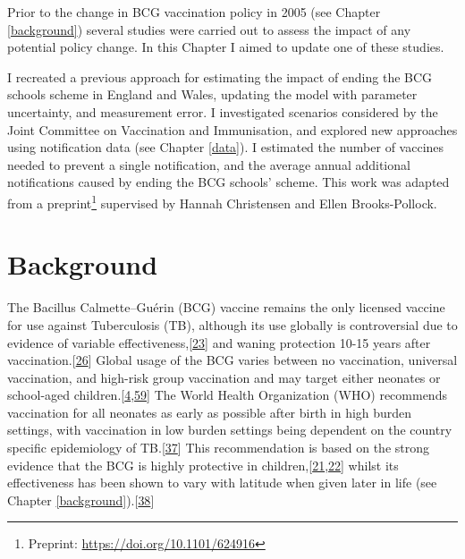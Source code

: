 \documentclass[11pt,twoside]{bristolthesis}
\begin{document}
  Prior to the change in BCG vaccination policy in 2005 (see Chapter \ref{background}) several studies were carried out to assess the impact of any potential policy change. In this Chapter I aimed to update one of these studies.
  
  I recreated a previous approach for estimating the impact of ending the BCG schools scheme in England and Wales, updating the model with parameter uncertainty, and measurement error. I investigated scenarios considered by the Joint Committee on Vaccination and Immunisation, and explored new approaches using notification data (see Chapter \ref{data}). I estimated the number of vaccines needed to prevent a single notification, and the average annual additional notifications caused by ending the BCG schools' scheme. This work was adapted from a preprint\footnote{Preprint: \url{https://doi.org/10.1101/624916}} supervised by Hannah Christensen and Ellen Brooks-Pollock.
  
  \hypertarget{background-3}{%
  \section{Background}\label{background-3}}
  
  The Bacillus Calmette--Guérin (BCG) vaccine remains the only licensed vaccine for use against Tuberculosis (TB), although its use globally is controversial due to evidence of variable effectiveness,{[}\protect\hyperlink{ref-Mangtani2014a}{23}{]} and waning protection 10-15 years after vaccination.{[}\protect\hyperlink{ref-Abubakar2013}{26}{]} Global usage of the BCG varies between no vaccination, universal vaccination, and high-risk group vaccination and may target either neonates or school-aged children.{[}\protect\hyperlink{ref-Zwerling2011a}{4},\protect\hyperlink{ref-Pilger2012b}{59}{]} The World Health Organization (WHO) recommends vaccination for all neonates as early as possible after birth in high burden settings, with vaccination in low burden settings being dependent on the country specific epidemiology of TB.{[}\protect\hyperlink{ref-WHO2017}{37}{]} This recommendation is based on the strong evidence that the BCG is highly protective in children,{[}\protect\hyperlink{ref-Rodrigues1993}{21},\protect\hyperlink{ref-Colditz1994}{22}{]} whilst its effectiveness has been shown to vary with latitude when given later in life (see Chapter \ref{background}).{[}\protect\hyperlink{ref-Mangtani2014}{38}{]}
  
\end{document}
